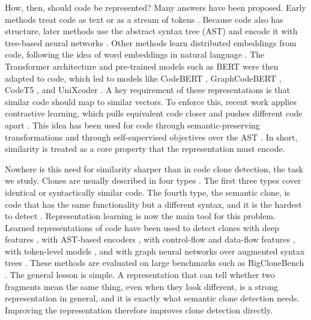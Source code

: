 \documentclass[authoryear,final,5p,times,twocolumn]{elsarticle}
\theoremstyle{plain}
\begin{document}
How, then, should code be represented? Many answers have been proposed.
Early methods treat code as text or as a stream of tokens
\cite{schleimer2003winnowing}.
Because code also has structure, later methods use the abstract syntax
tree (AST) and encode it with tree-based neural networks
\cite{mou2016tbcnn}. Other methods learn distributed embeddings from code,
following the idea of word embeddings in natural language
\cite{mikolov2013word2vec,alon2019code2vec}. The Transformer architecture
\cite{vaswani2017attention} and pre-trained models such as BERT
\cite{devlin2019bert} were then adapted to code, which led to models like
CodeBERT \cite{feng2020codebert}, GraphCodeBERT
\cite{guo2021graphcodebert}, CodeT5 \cite{wang2021codet5}, and UniXcoder
\cite{guo2022unixcoder}. A key requirement of these representations is that
similar code should map to similar vectors. To enforce this, recent work
applies contrastive learning, which pulls equivalent code closer and
pushes different code apart \cite{chen2020simclr}. This idea has been used
for code through semantic-preserving transformations
\cite{jain2021contracode,bui2021corder} and through self-supervised
objectives over the AST \cite{bui2021infercode}. In short, similarity is
treated as a core property that the representation must encode.

Nowhere is this need for similarity sharper than in code clone detection,
the task we study. Clones are usually described in four types
\cite{roy2007survey}. The first three types cover identical or
syntactically similar code. The fourth type, the semantic clone, is code
that has the same functionality but a different syntax, and it is the
hardest to detect \cite{alomari2020semanticclonebench}. Representation
learning is now the main tool for this problem. Learned representations of
code have been used to detect clones with deep features
\cite{white2016deep,wei2017cdlh}, with AST-based encoders
\cite{zhang2019astnn}, with control-flow and data-flow features
\cite{zhao2018deepsim}, with token-level models
\cite{li2017cclearner}, and with graph neural networks over augmented
syntax trees \cite{wang2020faast,wu2020scdetector}. These methods are
evaluated on large benchmarks such as BigCloneBench
\cite{svajlenko2014bigclonebench}. The general lesson is simple. A
representation that can tell whether two fragments mean the same thing,
even when they look different, is a strong representation in general, and
it is exactly what semantic clone detection needs. Improving the
representation therefore improves clone detection directly.
\end{document}
